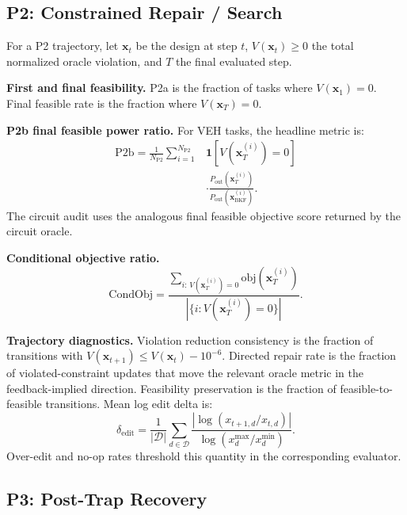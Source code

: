 \subsection{P2: Constrained Repair / Search}

For a P2 trajectory, let \(\mathbf{x}_t\) be the design at step \(t\), \(V(\mathbf{x}_t)\ge0\) the total normalized oracle violation, and \(T\) the final evaluated step.

\textbf{First and final feasibility.} P2a is the fraction of tasks where \(V(\mathbf{x}_1)=0\). Final feasible rate is the fraction where \(V(\mathbf{x}_T)=0\).

\textbf{P2b final feasible power ratio.} For VEH tasks, the headline metric is:
\begin{equation}
\begin{aligned}
\mathrm{P2b}
= \frac{1}{N_{\mathrm{P2}}}\sum_{i=1}^{N_{\mathrm{P2}}}
&\mathbf{1}\!\left[V(\mathbf{x}^{(i)}_T)=0\right] \\
&\cdot
\frac{P_{\mathrm{out}}(\mathbf{x}^{(i)}_T)}
{P_{\mathrm{out}}(\mathbf{x}^{(i)}_{\mathrm{BKF}})} .
\end{aligned}
\end{equation}
The circuit audit uses the analogous final feasible objective score returned by the circuit oracle.

\textbf{Conditional objective ratio.}
\begin{equation}
\mathrm{CondObj} =
\frac{
\sum_{i:\,V(\mathbf{x}^{(i)}_T)=0}
\mathrm{obj}(\mathbf{x}^{(i)}_T)}
{|\{i: V(\mathbf{x}^{(i)}_T)=0\}|}.
\end{equation}

\textbf{Trajectory diagnostics.} Violation reduction consistency is the fraction of transitions with \(V(\mathbf{x}_{t+1})\le V(\mathbf{x}_t)-10^{-6}\). Directed repair rate is the fraction of violated-constraint updates that move the relevant oracle metric in the feedback-implied direction. Feasibility preservation is the fraction of feasible-to-feasible transitions. Mean log edit delta is:
\begin{equation}
\delta_{\mathrm{edit}}
=
\frac{1}{|\mathcal{D}|}\sum_{d\in\mathcal{D}}
\frac{\left|\log(x_{t+1,d}/x_{t,d})\right|}
{\log(x_d^{\max}/x_d^{\min})}.
\end{equation}
Over-edit and no-op rates threshold this quantity in the corresponding evaluator.

\subsection{P3: Post-Trap Recovery}


